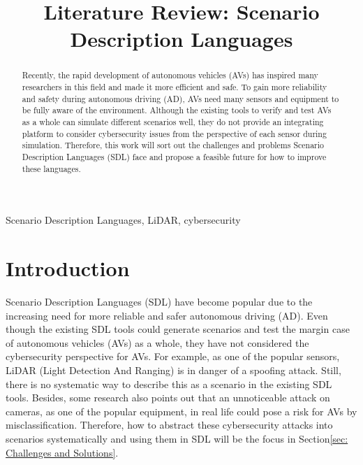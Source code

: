\documentclass[conference]{IEEEtran}
\begin{document}
\title{Literature Review: Scenario Description Languages
}

\maketitle

\begin{abstract}
Recently, the rapid development of autonomous vehicles (AVs) has inspired many researchers in this field and made it more efficient and safe. To gain more reliability and safety during autonomous driving (AD), AVs need many sensors and equipment to be fully aware of the environment. Although the existing tools to verify and test AVs as a whole can simulate different scenarios well, they do not provide an integrating platform to consider cybersecurity issues from the perspective of each sensor during simulation. Therefore, this work will sort out the challenges and problems Scenario Description Languages (SDL) face and propose a feasible future for how to improve these languages.
\end{abstract}

\begin{IEEEkeywords}
Scenario Description Languages, LiDAR, cybersecurity
\end{IEEEkeywords}

\section{Introduction}
Scenario Description Languages (SDL) have become popular due to the increasing need for more reliable and safer autonomous driving (AD). Even though the existing SDL tools could generate scenarios and test the margin case of autonomous vehicles (AVs) as a whole, they have not considered the cybersecurity perspective for AVs\cite{b1,b6}. For example, as one of the popular sensors, LiDAR (Light Detection And Ranging) is in danger of a spoofing attack. Still, there is no systematic way to describe this as a scenario in the existing SDL tools. \cite{b2} Besides, some research also points out that an unnoticeable attack on cameras, as one of the popular equipment, in real life could pose a risk for AVs by misclassification\cite{b5}. Therefore, how to abstract these cybersecurity attacks into scenarios systematically and using them in SDL will be the focus in Section\ref{sec: Challenges and Solutions}.
\end{document}
